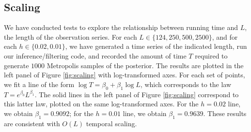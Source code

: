 \documentclass[wcp]{jmlr}
\begin{document}
\subsection{Scaling}
\label{sect:scaling}
We have conducted tests to explore the relationship between running
time and $L$, the length
of the observation series.  For each $L \in \{124, 250, 500,
2500\}$, and for each $h \in \{0.02, 0.01\}$, we have generated a
time series of the indicated length, run our inference/filtering code, and
recorded the amount of time $T$ required to generate $1000$ Metropolis
samples of the posterior.  The results are plotted in the left panel
of Figure
\ref{fig:scaling} with log-transformed axes. For each set of points,
we fit a line of the form $\log T = \beta_0 + \beta_1 \log L$, which
corresponds to the law $T = e^{\beta_0} L^{\beta_1}$.  The solid lines
in the left panel of Figure \ref{fig:scaling} correspond to this latter law, plotted on
the same log-transformed axes.  For the $h=0.02$ line, we obtain
$\beta_1 = 0.9092$; for the $h=0.01$ line, we obtain
$\beta_1=0.9639$.  These results are consistent with $O(L)$ temporal scaling.
\end{document}
